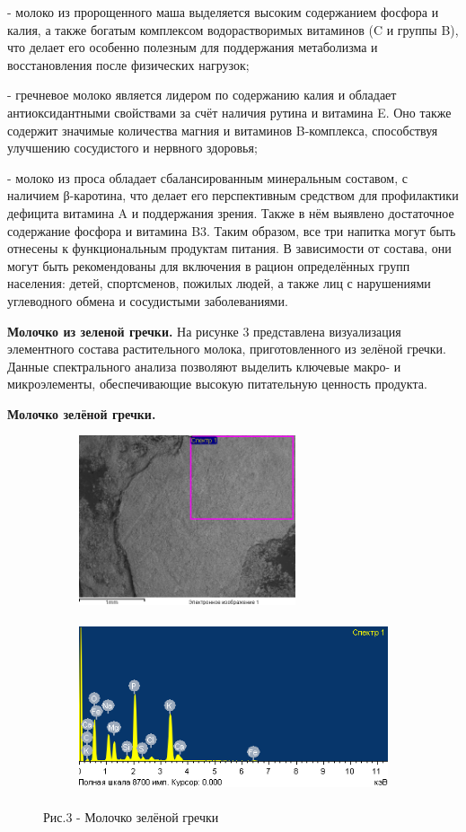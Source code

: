 \begin{multicols}{2}
- молоко из пророщенного маша выделяется высоким содержанием фосфора и
калия,
а также богатым комплексом водорастворимых витаминов (C и группы B), что
делает его особенно полезным для поддержания метаболизма и
восстановления после физических нагрузок;

- гречневое молоко является лидером по содержанию калия и обладает
антиоксидантными свойствами за счёт наличия рутина и витамина E. Оно
также содержит значимые количества магния и витаминов B-комплекса,
способствуя улучшению сосудистого и нервного здоровья;

- молоко из проса обладает сбалансированным минеральным составом, с
наличием β-каротина, что делает его перспективным средством для
профилактики дефицита витамина A и поддержания зрения. Также в нём
выявлено достаточное содержание фосфора и витамина B3.
Таким образом, все три напитка могут быть отнесены к функциональным
продуктам питания. В зависимости от состава, они могут быть
рекомендованы для включения в рацион определённых групп населения:
детей, спортсменов, пожилых людей, а также лиц с нарушениями углеводного
обмена и сосудистыми заболеваниями.

{\bfseries Молочко из зеленой гречки.} На рисунке 3 представлена
визуализация элементного состава растительного молока, приготовленного
из зелёной гречки. Данные спектрального анализа позволяют выделить
ключевые макро- и микроэлементы, обеспечивающие высокую питательную
ценность продукта.

{\bfseries Молочко зелёной гречки.}
\end{multicols}

\begin{figure}[H]
	\centering
	\begin{subfigure}{0.4\textwidth}
		\centering
		\includegraphics[height=5cm]{media/pish/image49}
	\end{subfigure}
	\hfill
	\begin{subfigure}{0.55\textwidth}
		\centering
		\includegraphics[height=5cm]{media/pish/image50}
	\end{subfigure}
    \caption*{Рис.3 - Молочко зелёной гречки}
\end{figure}


